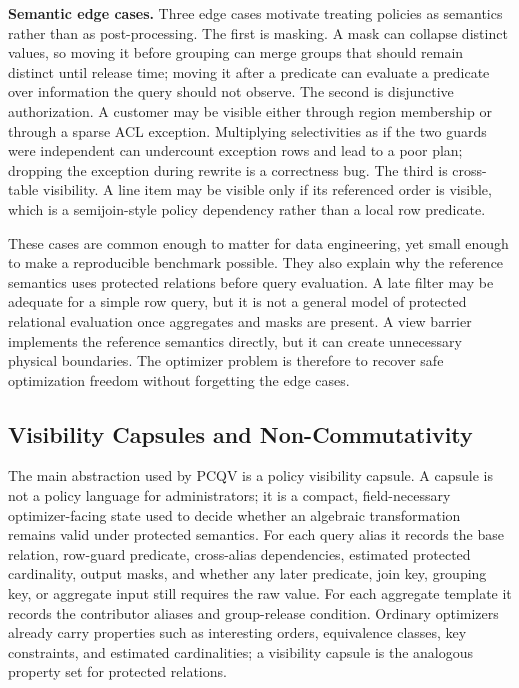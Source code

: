 \documentclass[conference]{IEEEtran}
\newcommand{\pcqv}{PCQV}
\begin{document}
\noindent\textbf{Semantic edge cases.}
Three edge cases motivate treating policies as semantics rather than as post-processing. The first is masking. A mask can collapse distinct values, so moving it before grouping can merge groups that should remain distinct until release time; moving it after a predicate can evaluate a predicate over information the query should not observe. The second is disjunctive authorization. A customer may be visible either through region membership or through a sparse ACL exception. Multiplying selectivities as if the two guards were independent can undercount exception rows and lead to a poor plan; dropping the exception during rewrite is a correctness bug. The third is cross-table visibility. A line item may be visible only if its referenced order is visible, which is a semijoin-style policy dependency rather than a local row predicate.

These cases are common enough to matter for data engineering, yet small enough to make a reproducible benchmark possible. They also explain why the reference semantics uses protected relations before query evaluation. A late filter may be adequate for a simple row query, but it is not a general model of protected relational evaluation once aggregates and masks are present. A view barrier implements the reference semantics directly, but it can create unnecessary physical boundaries. The optimizer problem is therefore to recover safe optimization freedom without forgetting the edge cases.

\subsection{Visibility Capsules and Non-Commutativity}
The main abstraction used by \pcqv{} is a policy visibility capsule. A capsule is not a policy language for administrators; it is a compact, field-necessary optimizer-facing state used to decide whether an algebraic transformation remains valid under protected semantics. For each query alias it records the base relation, row-guard predicate, cross-alias dependencies, estimated protected cardinality, output masks, and whether any later predicate, join key, grouping key, or aggregate input still requires the raw value. For each aggregate template it records the contributor aliases and group-release condition. Ordinary optimizers already carry properties such as interesting orders, equivalence classes, key constraints, and estimated cardinalities; a visibility capsule is the analogous property set for protected relations.
\end{document}
